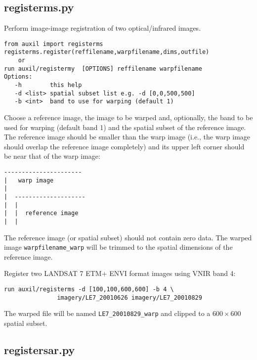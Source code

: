 \documentclass{paper}
\begin{document}
\subsection*{registerms.py}
Perform image-image registration of two optical/infrared images.
\begin{verbatim}
from auxil import registerms
registerms.register(reffilename,warpfilename,dims,outfile)
    or
run auxil/registermy  [OPTIONS] reffilename warpfilename
Options:
   -h        this help
   -d <list> spatial subset list e.g. -d [0,0,500,500]
   -b <int>  band to use for warping (default 1)
\end{verbatim}
Choose a reference image, the image to be warped and, optionally,
the band to be used for warping (default band 1) and the spatial subset
of the reference image. The reference image should be smaller than the warp image
(i.e., the warp image should overlap the reference image completely)
and its upper left corner should be near that of the warp image:


\eject


\begin{verbatim}
----------------------
|   warp image
|
|  --------------------
|  |
|  |  reference image
|  |
\end{verbatim}
The reference image (or spatial subset) should not contain zero data.
The warped image {\tt warpfilename\_warp} will be trimmed to the spatial
dimensions of the reference image.


 Register two LANDSAT 7 ETM+ ENVI format images using VNIR band 4:
\begin{lstlisting}
run auxil/registerms -d [100,100,600,600] -b 4 \
               imagery/LE7_20010626 imagery/LE7_20010829
\end{lstlisting}
The warped file will be named {\tt LE7\_20010829\_warp} and clipped to a $600\times 600$ spatial subset.


\subsection*{registersar.py}
\end{document}
